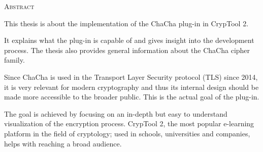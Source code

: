 
\begin{center}
  \textsc{Abstract}
\end{center}

\noindent
This thesis is about the implementation of the ChaCha plug-in in CrypTool 2.

\medskip
\noindent
It explains what the plug-in is capable of and gives insight into the development process. The thesis also provides general information about the ChaCha cipher family.

\medskip
\noindent
Since ChaCha is used in the Transport Layer Security protocol (TLS) since 2014, it is very relevant for modern cryptography and thus its internal design should be made more accessible to the broader public. This is the actual goal of the plug-in.

\medskip
\noindent
The goal is achieved by focusing on an in-depth but easy to understand visualization of the encryption process. CrypTool 2, the most popular e-learning platform in the field of cryptology; used in schools, universities and companies, helps with reaching a broad audience.

